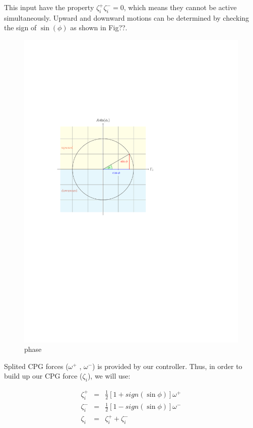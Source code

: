 \documentclass{article}
\begin{document}
This input have the property $\zeta_i^+  \zeta_i^- = 0$, which means they cannot be active simultaneously. Upward and downward motions can be determined by checking the sign of $\sin(\phi)$ as shown in Fig??.

\begin{figure}[thpb]
	\centering
		\centering
		\includegraphics[scale = 0.7]{phase_plot_cropped.pdf}
		\centering
		\caption{phase}
		\label{fig:CPG Network}

\end{figure}



Splited CPG forces ($\omega^+$ , $\omega^-$) is provided by our controller. Thus, in order to build up our CPG force ($\zeta_i$), we will use: 

\begin{eqnarray}\label{eq:spliting}
	\zeta_i^+ &=& \frac{1}{2}[1+sign(\sin\phi)] \omega^+\\
	\zeta_i^- &=& \frac{1}{2}[1-sign(\sin\phi)] \omega^-\\
	\zeta_i &=& \zeta_i^+ + \zeta_i^-
\end{eqnarray}
\end{document}
